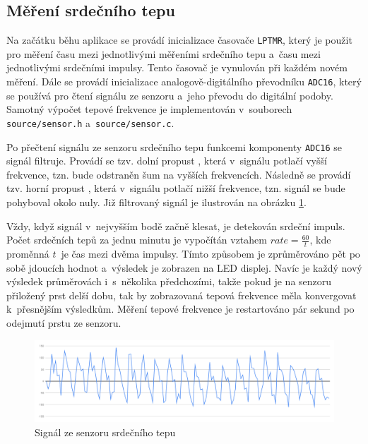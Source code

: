 \documentclass[a4paper, 11pt, twocolumn]{article}
\begin{document}
	\subsection{Měření srdečního tepu}

	Na začátku běhu aplikace se provádí inicializace časovače \texttt{LPTMR},
	který je použit pro měření času mezi jednotlivými měřeními srdečního tepu
	a~času mezi jednotlivými srdečními impulsy. Tento časovač je vynulován
	při každém novém měření. Dále se provádí inicializace analogově-digitálního
	převodníku \texttt{ADC16}, který se používá pro čtení signálu ze senzoru
	a~jeho převodu do digitální podoby. Samotný výpočet tepové frekvence je
	implementován v~souborech \texttt{source/sensor.h}
	a~\texttt{source/sensor.c}.

	Po přečtení signálu ze senzoru srdečního tepu funkcemi komponenty
	\texttt{ADC16} se signál filtruje. Provádí se tzv. dolní propust
	\cite{low_pass_filter}, která v~signálu potlačí vyšší frekvence, tzn.
	bude odstraněn šum na vyšších frekvencích. Následně se provádí tzv.
	horní propust \cite{high_pass_filter}, která v~signálu potlačí
	nižší frekvence, tzn. signál se bude pohyboval okolo nuly. Již filtrovaný
	signál je ilustrován na obrázku \ref{fig:sensor_data}.

	Vždy, když signál v~nejvyšším bodě začně klesat, je detekován srdeční
	impuls. Počet srdečních tepů za jednu minutu je vypočítán vztahem
	$ rate = \frac{60}{t} $, kde proměnná $ t $~je čas mezi dvěma impulsy.
	Tímto způsobem je zprůměrováno pět po sobě jdoucích hodnot a~výsledek
	je zobrazen na LED displej. Navíc je každý nový výsledek průměrovách
	i~s~několika předchozími, takže pokud je na senzoru přiložený prst
	delší dobu, tak by zobrazovaná tepová frekvence měla konvergovat
	k~přesnějším výsledkům. Měření tepové frekvence je restartováno pár
	sekund po odejmutí prstu ze senzoru.

	\begin{figure}[ht]
		\centering
		\includegraphics[width=1 \linewidth]{inc/sensor_data.pdf}

		\caption{Signál ze senzoru srdečního tepu}
		\label{fig:sensor_data}
	\end{figure}
\end{document}
